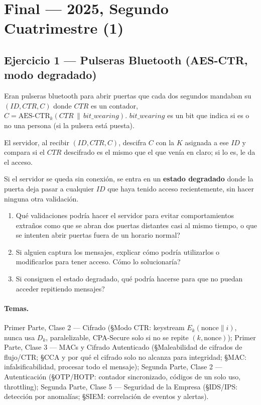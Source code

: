 \section{Final --- 2025, Segundo Cuatrimestre (1)}

\subsection{Ejercicio 1 --- Pulseras Bluetooth (AES-CTR, modo degradado)}

\begin{consigna}
Eran pulseras bluetooth para abrir puertas que cada dos segundos mandaban su
$(ID, CTR, C)$ donde $CTR$ es un contador, $C = \mathrm{AES\text{-}CTR}_k(CTR \,\|\,
\mathit{bit\_wearing})$. $\mathit{bit\_wearing}$ es un bit que indica si es o no una
persona (si la pulsera está puesta).

El servidor, al recibir $(ID, CTR, C)$, descifra $C$ con la $K$ asignada a ese $ID$
y compara si el $CTR$ descifrado es el mismo que el que venía en claro; si lo es, le
da el acceso.

Si el servidor se queda sin conexión, se entra en un \textbf{estado degradado} donde
la puerta deja pasar a cualquier $ID$ que haya tenido acceso recientemente, sin
hacer ninguna otra validación.

\begin{enumerate}
  \item[a)] \textquestiondown{}Qué validaciones podría hacer el servidor para evitar comportamientos
  extraños como que se abran dos puertas distantes casi al mismo tiempo, o que se
  intenten abrir puertas fuera de un horario normal?
  \item[b)] Si alguien captura los mensajes, explicar cómo podría utilizarlos o
  modificarlos para tener acceso. \textquestiondown{}Cómo lo solucionaría?
  \item[c)] Si consiguen el estado degradado, \textquestiondown{}qué podría hacerse para que no puedan
  acceder repitiendo mensajes?
\end{enumerate}
\end{consigna}

\paragraph{Temas.}
Primer Parte, Clase 2 --- Cifrado (\S Modo CTR: keystream $E_k(\text{nonce}\|i)$,
nunca usa $D_k$, paralelizable, CPA-Secure solo si no se repite $(k,\text{nonce})$);
Primer Parte, Clase 3 --- MACs y Cifrado Autenticado (\S Maleabilidad de cifrados de
flujo/CTR; \S CCA y por qué el cifrado solo no alcanza para integridad; \S MAC:
infalsificabilidad, procesar todo el mensaje); Segunda Parte, Clase 2 ---
Autenticación (\S OTP/HOTP: contador sincronizado, códigos de un solo uso,
throttling); Segunda Parte, Clase 5 --- Seguridad de la Empresa (\S IDS/IPS:
detección por anomalías; \S SIEM: correlación de eventos y alertas).

